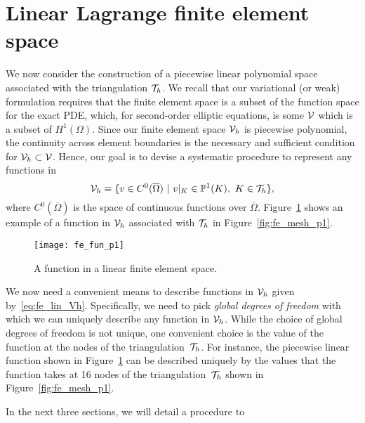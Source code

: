 \section{Linear Lagrange finite element space}
\label{sec:fe_lin_tri}
We now consider the construction of a piecewise linear polynomial space associated with the triangulation $\mathcal{T}_h$. We recall that our variational (or weak) formulation requires that the finite element space is a subset of the function space for the exact PDE, which, for second-order elliptic equations, is some $\mathcal{V}$ which is a subset of $H^1(\Omega)$. Since our finite element space $\mathcal{V}_h$ is piecewise polynomial, the continuity across element boundaries is the necessary and sufficient condition for $\mathcal{V}_h \subset \mathcal{V}$.  Hence, our goal is to devise a systematic procedure to represent any functions in
\begin{equation}
  \mathcal{V}_h \equiv \{ v \in C^0(\overline \Omega) \ | \ v|_K \in \mathbb{P}^1(K), \ K \in \mathcal{T}_h \},
  \label{eq:fe_lin_Vh}
\end{equation}
where $C^0(\overline \Omega)$ is the space of continuous functions over $\overline \Omega$.  Figure~\ref{fig:fe_fun_p1} shows an example of a function in $\mathcal{V}_h$ associated with $\mathcal{T}_h$ in Figure~\ref{fig:fe_mesh_p1}.
\begin{figure}
  \centering
  \texttt{[image: fe\_fun\_p1]}
  \caption{A function in a linear finite element space.}
  \label{fig:fe_fun_p1}
\end{figure}


We now need a convenient means to describe functions in $\mathcal{V}_h$ given by~\eqref{eq:fe_lin_Vh}.  Specifically, we need to pick \emph{global degrees of freedom} with which we can uniquely describe any function in $\mathcal{V}_h$.  While the choice of global degrees of freedom is not unique, one convenient choice is the value of the function at the nodes of the triangulation~$\mathcal{T}_h$.  For instance, the piecewise linear function shown in Figure~\ref{fig:fe_fun_p1} can be described uniquely by the values that the function takes at 16 nodes of the triangulation~$\mathcal{T}_h$ shown in Figure~\ref{fig:fe_mesh_p1}.

In the next three sections, we will detail a procedure to 



